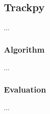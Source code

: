 \subsection{Trackpy}
\label{sec:link2d:trackpy}

...

\subsubsection{Algorithm}

...

\subsubsection{Evaluation}

...

